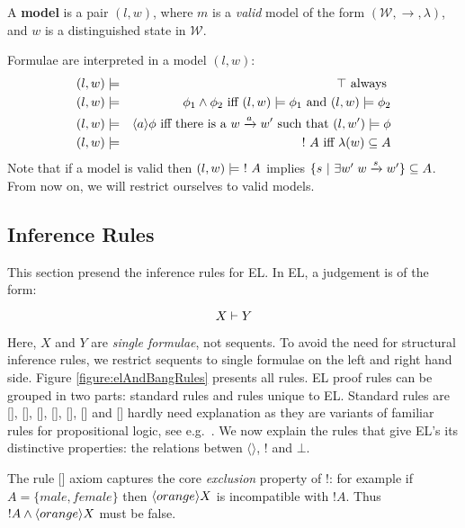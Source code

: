 \begin{definition}
A {\bf  model} is a pair $(l,w)$, where $m$ is a \emph{valid} model of the form $(\mathcal{W}, \rightarrow, \lambda)$, and $w$ is a distinguished state in $\mathcal{W}$.
\end{definition}
Formulae are interpreted in a  model $(l,w)$:
\begin{eqnarray*}
(l,w) & \models & \top  \mbox{ always }  \\
(l,w) & \models & \phi_1 \land \phi_2 \mbox{ iff } (l,w)  \models \phi_1 \mbox { and } (l,w) \models \phi_2  \\
(l,w) & \models & \langle a \rangle \phi \mbox{ iff there is a } w \xrightarrow{a} w' \mbox { such that } (l,w') \models \phi  \\
(l,w) & \models & \ ! \  A \mbox{ iff } \lambda(w) \subseteq A
\end{eqnarray*}
Note that if a model is valid then $(l,w) \models \ ! \  A$ implies $\{s \ | \  \exists w' \; w \xrightarrow{s} w'\} \subseteq A$.
From now on, we will restrict ourselves to valid models.






\subsection{Inference Rules}

This section presend the inference rules for EL.
In EL, a judgement is of the form:

\[
  X \vdash Y
\]

\NI Here, $X$ and $Y$ are \emph{single formulae}, not sequents.  To
avoid the need for structural inference rules, we restrict sequents to
single formulae on the left and right hand side. Figure
\ref{figure:elAndBangRules} presents all rules.  EL proof rules can be
grouped in two parts: standard rules and rules unique to EL.  Standard
rules are [], [],
[], [],
[], [] and
[] hardly need explanation as they are variants
of familiar rules for propositional logic, see
e.g.~\cite{TroelstraAS:basprot,vanDalenD:logstr}.  We now explain the
rules that give EL's its distinctive properties: the relations betwen
$\langle \rangle$, $!$ and $\bot$.

The rule [] axiom captures the core
\emph{exclusion} property of !: for example if $A = \{male, female\}$
then $\langle orange \rangle X$ is incompatible with $!A$. Thus $!A \land
\langle orange \rangle X$ must be false.

